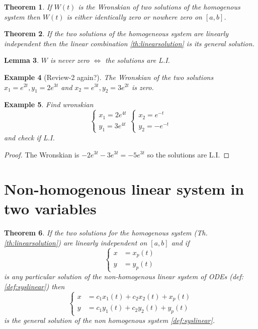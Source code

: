 \documentclass[oneside,11pt,pdftex,final]{book}%
\numberwithin{equation}{section}
\newtheorem{theorem}{Theorem}[chapter]%
\newtheorem{lemma}[theorem]{Lemma}
\newtheorem{example}[theorem]{Example}
\numberwithin{section}{chapter}
\numberwithin{equation}{chapter}
\begin{document}
\begin{theorem}
	If $ W(t) $ is the Wronskian of two solutions of the homogenous system then $ W(t) $ is either identically zero or nowhere zero on $ [a,b] $.
\end{theorem}

\begin{theorem}
	If the two solutions of the homogeneous system are linearly independent then the linear combination \ref{th:linearsolution} is its general solution.
\end{theorem}
\begin{lemma}
	$ W $ is never zero $ \iff  $ the solutions are L.I.
\end{lemma}
\begin{example}[Review-2 again?]
	The Wronskian of the two solutions $ x_1=e^{2t},y_1=2e^{3t} $ and $ x_2=e^{3t},y_2=3e^{2t} $ is zero.
\end{example}

\begin{example}
	Find wronskian \[ \begin{cases}
		x_1=2e^{4t}\\
		y_1=3e^{4t}
	\end{cases} \begin{cases}
	x_2=e^{-t}\\
	y_2=-e^{-t}
\end{cases}\] and check if L.I.
\end{example}
\begin{proof}
	The Wronskian is $ -2e^{3t}-3e^{3t}=-5e^{3t} $ so the solutions are L.I.
\end{proof}


\section{Non-homogenous linear system in two variables}
\begin{theorem}
	If the two solutions for the homogenous system (Th. \ref{th:linearsolution}) are linearly independent on $ [a,b] $ and if 
	\[ \begin{cases}
		x&=x_p(t)\\
		y&=y_p(t)
	\end{cases} \]
	is any particular solution of the non-homogenous linear system of ODEs (def: \ref{def:syslinear}) then 
	\[ \begin{cases}
		x&=c_1x_1(t)+c_2x_2(t)+x_p(t)\\
		y&=c_1y_1(t)+c_2y_2(t)+y_p(t)
	\end{cases} \]
is the general solution of the non homogenous system \ref{def:syslinear}.
\end{theorem}
\end{document}
